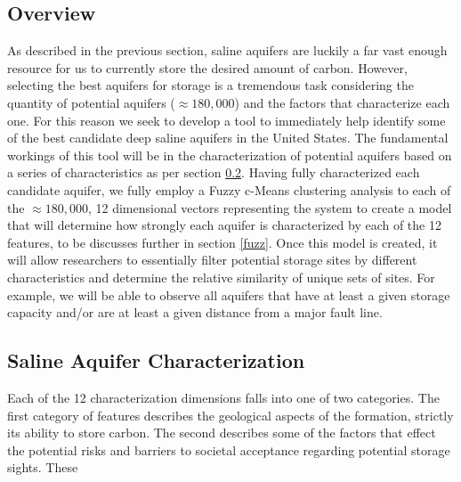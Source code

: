 \documentclass[letterpaper, 12pt]{article}
\begin{document}
\subsection{Overview}
As described in the previous section, saline aquifers are luckily a far vast enough resource for us to currently store the desired amount of carbon. However, selecting the best aquifers for storage is a tremendous task considering the quantity of potential aquifers ($\approx180,000$) and the factors that characterize each one. For this reason we seek to develop a tool to immediately help identify some of the best candidate deep saline aquifers in the United States. 
The fundamental workings of this tool will be in the characterization of potential aquifers based on a series of characteristics as per section \ref{wellchar}. Having fully characterized each candidate aquifer, we fully employ a Fuzzy c-Means clustering analysis to each of the $\approx180,000$, 12 dimensional vectors representing the system to create a model that will determine how strongly each aquifer is characterized by each of the 12 features, to be discusses further in section \ref{fuzz}. Once this model is created, it will allow researchers to essentially filter potential storage sites by different characteristics and determine the relative similarity of unique sets of sites. For example, we will be able to observe all aquifers that have at least a given storage capacity and/or are at least a given distance from a major fault line.  

\subsection{Saline Aquifer Characterization} \label{wellchar}
Each of the 12 characterization dimensions falls into one of two categories. The first category of features describes the geological aspects of the formation, strictly its ability to store carbon. The second describes some of the factors that effect the potential risks and barriers to societal acceptance regarding potential storage sights. These 
\end{document}
